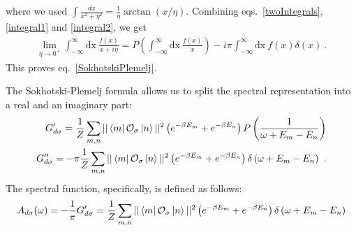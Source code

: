 \documentclass[reprint,hidelinks,onecolumn]{revtex4-2}
\begin{document}
where we used \(\int \frac{dx}{x^2 + \eta^2} = \frac{1}{\eta} \arctan\left( x/\eta \right) \). Combining eqs.~\ref{twoIntegrals},\ref{integral1} and \ref{integral2}, we get
\begin{equation}\begin{aligned}
	\lim_{\eta \to 0^+}\int_{-\infty}^{\infty} \text{dx}~\frac{f(x)}{x + i \eta} = P\left(\int_{-\infty}^{\infty} \text{dx}~\frac{f(x)}{x}\right) - i\pi \int_{-\infty}^{\infty} \text{dx}~f(x)\delta(x)~.
\end{aligned}\end{equation}
This proves eq.~\ref{SokhotskiPlemelj}.

The Sokhotski-Plemelj formula allows us to split the spectral representation into a real and an imaginary part:
\begin{equation}\begin{aligned}
	G_{d\sigma}^\prime = \frac{1}{Z}\sum_{m,n}||\bra{m}\mathcal{O}_{\sigma}\ket{n}||^2\left( e^{-\beta E_m} + e^{-\beta E_n}\right)P\left(\frac{1}{\omega + E_m - E_n}\right)\\
	G_{d\sigma}^{\prime\prime} = -\pi\frac{1}{Z}\sum_{m,n}||\bra{m}\mathcal{O}_{\sigma}\ket{n}||^2\left( e^{-\beta E_m} + e^{-\beta E_n}\right)\delta\left(\omega + E_m - E_n\right)~.
\end{aligned}\end{equation}
The spectral function, specifically, is defined as follows:
\begin{equation}\begin{aligned}
	A_{d\sigma}(\omega) = -\frac{1}{\pi}G_{d\sigma}^\prime = \frac{1}{Z}\sum_{m,n}||\bra{m}\mathcal{O}_{\sigma}\ket{n}||^2\left( e^{-\beta E_m} + e^{-\beta E_n}\right)\delta\left(\omega + E_m - E_n\right)
\end{aligned}\end{equation}
\end{document}
